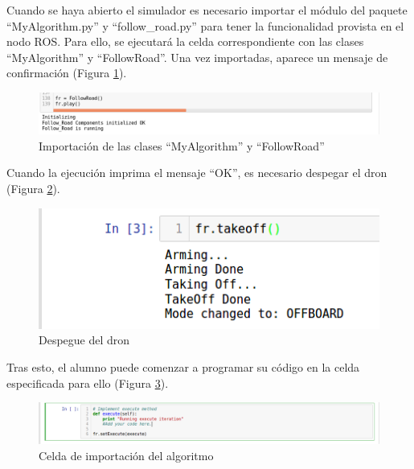 Cuando se haya abierto el simulador es necesario importar el módulo del paquete ``MyAlgorithm.py'' y ``follow\_road.py'' para tener la funcionalidad provista en el nodo ROS. Para ello, se ejecutará la celda correspondiente con las clases ``MyAlgorithm'' y ``FollowRoad''. Una vez importadas, aparece un mensaje de confirmación (Figura \ref{fig.impmafr}).

\begin{figure}[H]
  \begin{center}
    \includegraphics[width=1.2\textwidth]{figures/imp_Ma_FR.png}
		\caption{Importación de las clases ``MyAlgorithm'' y ``FollowRoad''}
		\label{fig.impmafr}
		\end{center}
\end{figure}

Cuando la ejecución imprima el mensaje ``OK'', es necesario despegar el dron (Figura \ref{fig.despfr}).

\begin{figure}[H]
  \begin{center}
    \includegraphics[width=.5\textwidth]{figures/despuegue_fr.png}
		\caption{Despegue del dron}
		\label{fig.despfr}
		\end{center}
\end{figure}

Tras esto, el alumno puede comenzar a programar su código en la celda especificada para ello (Figura \ref{fig.impalg}).

\begin{figure}[H]
  \begin{center}
    \includegraphics[width=1.5\textwidth]{figures/imp_alg.png}
		\caption{Celda de importación del algoritmo}
		\label{fig.impalg}
		\end{center}
\end{figure}

